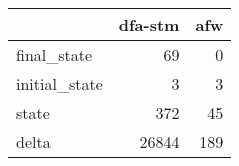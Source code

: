 \begin{tabular}{lrr}
\toprule
{} &  dfa-stm &  afw \\
\midrule
final\_state   &       69 &    0 \\
initial\_state &        3 &    3 \\
state         &      372 &   45 \\
delta         &    26844 &  189 \\
\bottomrule
\end{tabular}

